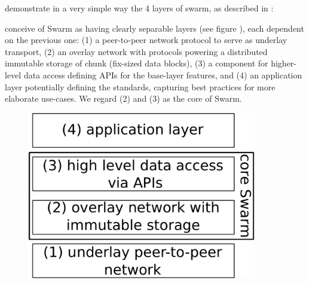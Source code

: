 \documentclass[a4paper,12pt,fullpage,openany,hyperfootnotes,hidelinks]{scrbook}
\begin{document}

demonstrate in a very simple way the 4 layers of swarm, as described in : 

conceive of Swarm as having clearly separable layers (see figure ), each dependent on the previous one: (1) a peer-to-peer network protocol to serve as underlay transport, (2) an overlay network with protocols powering a distributed immutable storage of chunk (fix-sized data blocks), (3) a component for higher-level data access defining APIs for the base-layer features, and (4) an application layer potentially defining the standards, capturing best practices for more elaborate use-cases. We regard (2) and (3) as the core of Swarm.


\begin{figure}[htp]
    \centering
    \includegraphics[width=10cm]{fig-drafts/swarm-layered-design.pdf}
\end{figure}


\end{document}
